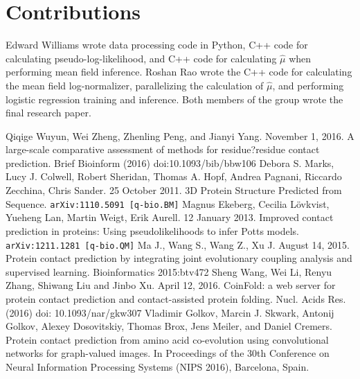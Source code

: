 \documentclass{article}
\begin{document}
\section{Contributions}

Edward Williams wrote data processing code in Python, C++ code for calculating pseudo-log-likelihood, and C++ code for calculating $\hat{\mu}$ when performing mean field inference. Roshan Rao wrote the C++ code for calculating the mean field log-normalizer, parallelizing the calculation of $\hat{\mu}$, and performing logistic regression training and inference. Both members of the group wrote the final research paper.  



\begin{thebibliography}{9}
{\setlength\itemsep{0.0em}
	Qiqige Wuyun, Wei Zheng, Zhenling Peng, and Jianyi Yang. November 1, 2016. A large-scale comparative assessment of methods for residue?residue contact prediction. Brief Bioinform (2016) doi:10.1093/bib/bbw106
	Debora S. Marks, Lucy J. Colwell, Robert Sheridan, Thomas A. Hopf, Andrea Pagnani, Riccardo Zecchina, Chris Sander. 25 October 2011. 3D Protein Structure Predicted from Sequence. {\tt arXiv:1110.5091 [q-bio.BM]}
	Magnus Ekeberg, Cecilia L{\"o}vkvist, Yueheng Lan, Martin Weigt, Erik Aurell. 12 January 2013. Improved contact prediction in proteins: Using pseudolikelihoods to infer Potts models. {\tt arXiv:1211.1281 [q-bio.QM]}
	 Ma J., Wang S., Wang Z., Xu J. August 14, 2015. Protein contact prediction by integrating joint evolutionary coupling analysis and supervised learning. Bioinformatics 2015:btv472
	Sheng Wang,  Wei Li, Renyu Zhang, Shiwang Liu and Jinbo Xu. April 12, 2016. CoinFold: a web server for protein contact prediction and contact-assisted protein folding. Nucl. Acids Res. (2016) doi: 10.1093/nar/gkw307
	Vladimir Golkov, Marcin J. Skwark, Antonij Golkov, Alexey Dosovitskiy, Thomas Brox, Jens Meiler, and Daniel Cremers. Protein contact prediction from amino acid co-evolution using convolutional networks for graph-valued images. In Proceedings of the 30th Conference on Neural Information Processing Systems (NIPS 2016), Barcelona, Spain.
}
\end{thebibliography}
\end{document}
